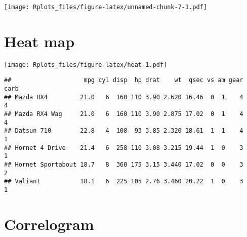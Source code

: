 \documentclass[]{article}
\newenvironment{Shaded}{\begin{snugshade}}{\end{snugshade}}
\newcommand{\KeywordTok}[1]{\textcolor[rgb]{0.13,0.29,0.53}{\textbf{#1}}}
\newcommand{\DataTypeTok}[1]{\textcolor[rgb]{0.13,0.29,0.53}{#1}}
\newcommand{\StringTok}[1]{\textcolor[rgb]{0.31,0.60,0.02}{#1}}
\newcommand{\OperatorTok}[1]{\textcolor[rgb]{0.81,0.36,0.00}{\textbf{#1}}}
\newcommand{\NormalTok}[1]{#1}
\begin{document}
\texttt{[image: Rplots\_files/figure-latex/unnamed-chunk-7-1.pdf]}

\section{Heat map}\label{heat-map}

\begin{Shaded}
\end{Shaded}

\texttt{[image: Rplots\_files/figure-latex/heat-1.pdf]}

\begin{verbatim}
##                    mpg cyl disp  hp drat    wt  qsec vs am gear carb
## Mazda RX4         21.0   6  160 110 3.90 2.620 16.46  0  1    4    4
## Mazda RX4 Wag     21.0   6  160 110 3.90 2.875 17.02  0  1    4    4
## Datsun 710        22.8   4  108  93 3.85 2.320 18.61  1  1    4    1
## Hornet 4 Drive    21.4   6  258 110 3.08 3.215 19.44  1  0    3    1
## Hornet Sportabout 18.7   8  360 175 3.15 3.440 17.02  0  0    3    2
## Valiant           18.1   6  225 105 2.76 3.460 20.22  1  0    3    1
\end{verbatim}

\section{Correlogram}\label{correlogram}
\end{document}
